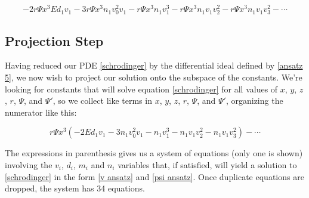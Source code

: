 \documentclass{article}
\begin{document}
\begin{equation}
-2r\Psi x^3 E d_1 v_1 - 3r\Psi x^3 n_1 v_0^2 v_1 - r\Psi x^3 n_1 v_1^3 - r\Psi x^3 n_1 v_1 v_2^2 - r\Psi x^3 n_1 v_1 v_3^2 - \cdots
\end{equation}

\subsection*{Projection Step}

Having reduced our PDE \eqref{schrodinger} by the differential ideal defined by \eqref{ansatz 5},
we now wish to project our solution onto the subspace of the constants.  We're looking for
constants that will solve equation \eqref{schrodinger} for all values of $x$, $y$, $z$, $r$,
$\Psi$, and $\Psi'$, so
we collect like terms in $x$, $y$, $z$, $r$, $\Psi$, and $\Psi'$, organizing the numerator like this:

\begin{equation}
r\Psi x^3 \left(-2 E d_1 v_1 - 3 n_1 v_0^2 v_1 - n_1 v_1^3 - n_1 v_1 v_2^2 - n_1 v_1 v_3^2\right) - \cdots
\end{equation}

The expressions in parenthesis gives us a system of equations (only one is shown)
involving the $v_i$, $d_i$, $m_i$ and $n_i$ variables that, if satisfied,
will yield a solution to \eqref{schrodinger} in the form \eqref{v ansatz} and \eqref{psi ansatz}.  Once
duplicate equations are dropped, the system has 34 equations.
\end{document}
